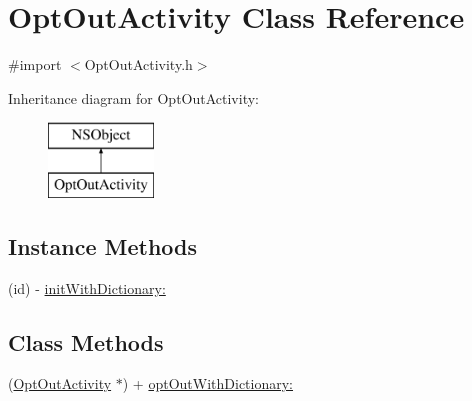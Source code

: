 \hypertarget{interface_opt_out_activity}{\section{Opt\-Out\-Activity Class Reference}
\label{interface_opt_out_activity}
}


{\ttfamily \#import $<$Opt\-Out\-Activity.\-h$>$}

Inheritance diagram for Opt\-Out\-Activity\-:\begin{figure}[H]
\begin{center}
\leavevmode
\includegraphics[height=2.000000cm]{interface_opt_out_activity}
\end{center}
\end{figure}
\subsection*{Instance Methods}
\begin{DoxyCompactItemize}
\item 
(id) -\/ \hyperlink{interface_opt_out_activity_a4501df4cb0edb6fa53d8863260932b12}{init\-With\-Dictionary\-:}
\end{DoxyCompactItemize}
\subsection*{Class Methods}
\begin{DoxyCompactItemize}
\item 
(\hyperlink{interface_opt_out_activity}{Opt\-Out\-Activity} $\ast$) + \hyperlink{interface_opt_out_activity_a9d8e44cf828be654d4cef63adb976679}{opt\-Out\-With\-Dictionary\-:}
\end{DoxyCompactItemize}
